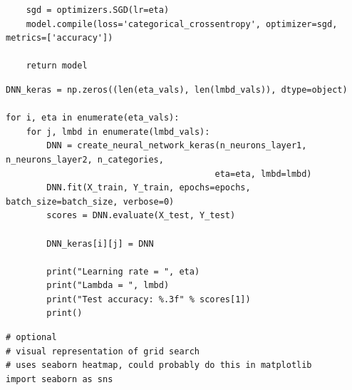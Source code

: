 \documentclass{beamer}
\begin{document}
\begin{frame}
\begin{verbatim}
    sgd = optimizers.SGD(lr=eta)
    model.compile(loss='categorical_crossentropy', optimizer=sgd, metrics=['accuracy'])
    
    return model

\end{verbatim}


















\begin{verbatim}
DNN_keras = np.zeros((len(eta_vals), len(lmbd_vals)), dtype=object)
        
for i, eta in enumerate(eta_vals):
    for j, lmbd in enumerate(lmbd_vals):
        DNN = create_neural_network_keras(n_neurons_layer1, n_neurons_layer2, n_categories,
                                         eta=eta, lmbd=lmbd)
        DNN.fit(X_train, Y_train, epochs=epochs, batch_size=batch_size, verbose=0)
        scores = DNN.evaluate(X_test, Y_test)
        
        DNN_keras[i][j] = DNN
        
        print("Learning rate = ", eta)
        print("Lambda = ", lmbd)
        print("Test accuracy: %.3f" % scores[1])
        print()

\end{verbatim}


































\begin{verbatim}
# optional
# visual representation of grid search
# uses seaborn heatmap, could probably do this in matplotlib
import seaborn as sns


\end{verbatim}
\end{frame}
\end{document}
